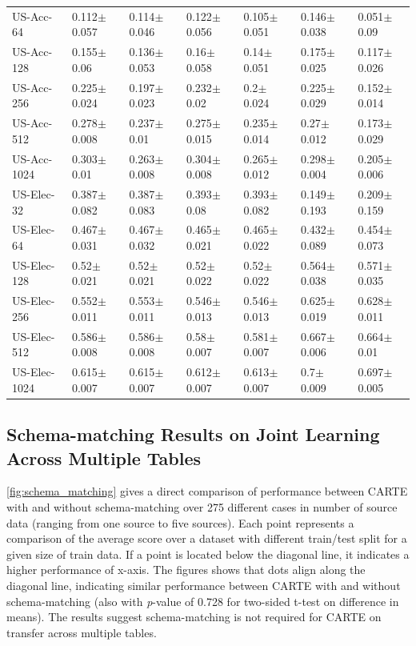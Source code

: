 \documentclass{article}
\theoremstyle{plain}
\theoremstyle{definition}
\theoremstyle{remark}
\begin{document}
\begin{table}[!h]
\begin{center}
\begin{tabular}{lllllll}
    US-Acc-64    &  0.112$\pm$0.057 &  0.114$\pm$0.046 &  0.122$\pm$0.056 &  0.105$\pm$0.051 &  0.146$\pm$0.038 &   0.051$\pm$0.09 \\
    US-Acc-128   &   0.155$\pm$0.06 &  0.136$\pm$0.053 &   0.16$\pm$0.058 &   0.14$\pm$0.051 &  0.175$\pm$0.025 &  0.117$\pm$0.026 \\
    US-Acc-256   &  0.225$\pm$0.024 &  0.197$\pm$0.023 &   0.232$\pm$0.02 &    0.2$\pm$0.024 &  0.225$\pm$0.029 &  0.152$\pm$0.014 \\
    US-Acc-512   &  0.278$\pm$0.008 &   0.237$\pm$0.01 &  0.275$\pm$0.015 &  0.235$\pm$0.014 &   0.27$\pm$0.012 &  0.173$\pm$0.029 \\
    US-Acc-1024  &   0.303$\pm$0.01 &  0.263$\pm$0.008 &  0.304$\pm$0.008 &  0.265$\pm$0.012 &  0.298$\pm$0.004 &  0.205$\pm$0.006 \\
    \midrule
    US-Elec-32   &  0.387$\pm$0.082 &  0.387$\pm$0.083 &   0.393$\pm$0.08 &  0.393$\pm$0.082 &  0.149$\pm$0.193 &  0.209$\pm$0.159 \\
    US-Elec-64   &  0.467$\pm$0.031 &  0.467$\pm$0.032 &  0.465$\pm$0.021 &  0.465$\pm$0.022 &  0.432$\pm$0.089 &  0.454$\pm$0.073 \\
    US-Elec-128  &   0.52$\pm$0.021 &   0.52$\pm$0.021 &   0.52$\pm$0.022 &   0.52$\pm$0.022 &  0.564$\pm$0.038 &  0.571$\pm$0.035 \\
    US-Elec-256  &  0.552$\pm$0.011 &  0.553$\pm$0.011 &  0.546$\pm$0.013 &  0.546$\pm$0.013 &  0.625$\pm$0.019 &  0.628$\pm$0.011 \\
    US-Elec-512  &  0.586$\pm$0.008 &  0.586$\pm$0.008 &   0.58$\pm$0.007 &  0.581$\pm$0.007 &  0.667$\pm$0.006 &   0.664$\pm$0.01 \\
    US-Elec-1024 &  0.615$\pm$0.007 &  0.615$\pm$0.007 &  0.612$\pm$0.007 &  0.613$\pm$0.007 &    0.7$\pm$0.009 &  0.697$\pm$0.005 \\
    \bottomrule
    \end{tabular}
\end{center}
\end{table}

\subsection{Schema-matching Results on Joint Learning Across Multiple Tables}\label{app:schema-matching}

\autoref{fig:schema_matching} gives a direct comparison of performance between CARTE with and without schema-matching over 275 different cases in number of source data (ranging from one source to five sources). Each point represents a comparison of the average score over a dataset with different train/test split for a given size of train data. If a point is located below the diagonal line, it indicates a higher performance of x-axis. The figures shows that dots align along the diagonal line, indicating similar performance between CARTE with and without schema-matching (also with \emph{p}-value of 0.728 for two-sided t-test on difference in means). The results suggest schema-matching is not required for CARTE on transfer across multiple tables.
\end{document}
